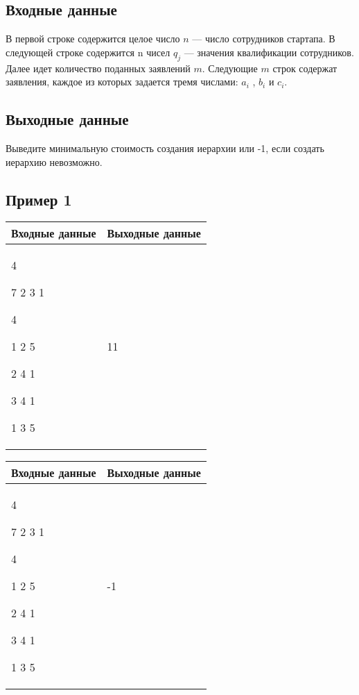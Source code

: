 \documentclass[a4]{article}
\begin{document}
\subsection*{Входные данные}
\label{sec:orge854c50}
В первой строке содержится целое число \(n\) — число сотрудников стартапа. В следующей строке содержится n чисел \(q_j\) — значения квалификации сотрудников. Далее идет
количество поданных заявлений \(m\). Следующие \(m\) строк содержат заявления, каждое из
которых задается тремя числами: \(a_i\)
, \(b_i\) и \(c_i\).

\subsection*{Выходные данные}
\label{sec:org1ab7414}
Выведите минимальную стоимость создания иерархии или -1, если создать иерархию
невозможно.

\subsection*{Пример 1}
\label{sec:org25482f8}

\begin{table}[H]
\begin{center}
\begin{tabular}{|m{4cm}|m{4cm}|}
\hline
Входные данные & Выходные данные \\ \hline
4

7 2 3 1

4

1 2 5

2 4 1

3 4 1

1 3 5
&
11
\\ \hline
\end{tabular}
\end{center}
\end{table}

\begin{table}[H]
\begin{center}
\begin{tabular}{|m{4cm}|m{4cm}|}
\hline
Входные данные & Выходные данные \\ \hline
4

7 2 3 1

4

1 2 5

2 4 1

3 4 1

1 3 5
&
-1
\\ \hline
\end{tabular}
\end{center}
\end{table}
\pagebreak
\end{document}
